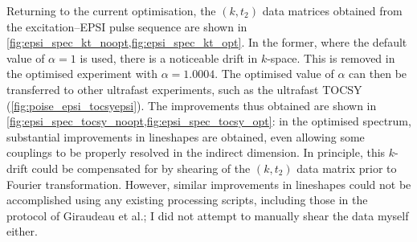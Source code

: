 Returning to the current optimisation, the $(k, t_2)$ data matrices obtained from the excitation--EPSI pulse sequence are shown in \cref{fig:epsi_spec_kt_noopt,fig:epsi_spec_kt_opt}.
In the former, where the default value of $\alpha = 1$ is used, there is a noticeable drift in $k$-space.
This is removed in the optimised experiment with $\alpha = 1.0004$.
The optimised value of $\alpha$ can then be transferred to other ultrafast experiments, such as the ultrafast TOCSY (\cref{fig:poise_epsi_tocsyepsi}).
The improvements thus obtained are shown in \cref{fig:epsi_spec_tocsy_noopt,fig:epsi_spec_tocsy_opt}: in the optimised spectrum, substantial improvements in lineshapes are obtained, even allowing some couplings to be properly resolved in the indirect dimension.
In principle, this $k$-drift could be compensated for by shearing of the $(k, t_2)$ data matrix prior to Fourier transformation.
However, similar improvements in lineshapes could not be accomplished using any existing processing scripts, including those in the protocol of Giraudeau et al.\autocite{Gouilleux2018ARNMRS}; I did not attempt to manually shear the data myself either.
